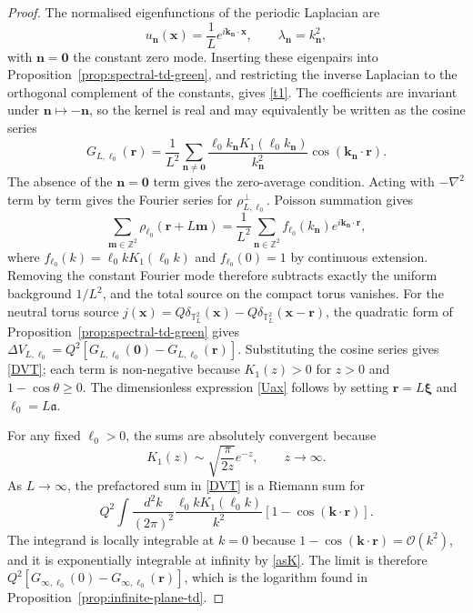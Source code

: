 \documentclass[openacc]{rsproca_new}%
\begin{document}
\begin{proof}
The normalised eigenfunctions of the periodic Laplacian are
\begin{equation}
  u_{\mathbf n}(\mathbf x)=\frac{1}{L}e^{i\mathbf k_{\mathbf n}\cdot\mathbf x},
  \qquad
  \lambda_{\mathbf n}=k_{\mathbf n}^2,
\end{equation}
with \(\mathbf n=\mathbf 0\) the constant zero mode. Inserting these eigenpairs into Proposition~\ref{prop:spectral-td-green}, and restricting the inverse Laplacian to the orthogonal complement of the constants, gives \eqref{t1}. The coefficients are invariant under \(\mathbf n\mapsto-\mathbf n\), so the kernel is real and may equivalently be written as the cosine series
\begin{equation}
  G_{L,\ell_0}(\mathbf r)=\frac{1}{L^2}\sum_{\mathbf n\neq\mathbf 0}
  \frac{\ell_0 k_{\mathbf n}K_1(\ell_0 k_{\mathbf n})}{k_{\mathbf n}^2}
  \cos(\mathbf k_{\mathbf n}\cdot\mathbf r).
\end{equation}
The absence of the \(\mathbf n=\mathbf 0\) term gives the zero-average condition. Acting with \(-\nabla^2\) term by term gives the Fourier series for \(\rho_{L,\ell_0}^{\perp}\). Poisson summation gives
\begin{equation}
  \sum_{\mathbf m\in\mathbb Z^2}\rho_{\ell_0}(\mathbf r+L\mathbf m)
  =\frac{1}{L^2}\sum_{\mathbf n\in\mathbb Z^2}f_{\ell_0}(k_{\mathbf n})e^{i\mathbf k_{\mathbf n}\cdot\mathbf r},
\end{equation}
where \(f_{\ell_0}(k)=\ell_0 kK_1(\ell_0 k)\) and \(f_{\ell_0}(0)=1\) by continuous extension. Removing the constant Fourier mode therefore subtracts exactly the uniform background \(1/L^2\), and the total source on the compact torus vanishes. For the neutral torus source \(j(\mathbf x)=Q\delta_{\mathbb T_L^2}(\mathbf x)-Q\delta_{\mathbb T_L^2}(\mathbf x-\mathbf r)\), the quadratic form of Proposition~\ref{prop:spectral-td-green} gives \(\Delta V_{L,\ell_0}=Q^2[G_{L,\ell_0}(\mathbf 0)-G_{L,\ell_0}(\mathbf r)]\). Substituting the cosine series gives \eqref{DVT}; each term is non-negative because \(K_1(z)>0\) for \(z>0\) and \(1-\cos\theta\geq0\). The dimensionless expression \eqref{Uax} follows by setting \(\mathbf r=L\boldsymbol{\xi}\) and \(\ell_0=L\mathfrak a\).

For any fixed \(\ell_0>0\), the sums are absolutely convergent because \cite{Abramowitz1972}
\begin{equation}\label{asK}
  K_1(z)\sim\sqrt{\frac{\pi}{2z}}e^{-z},\qquad z\to\infty .
\end{equation}
As \(L\to\infty\), the prefactored sum in \eqref{DVT} is a Riemann sum for
\begin{equation}
  Q^2\int\frac{d^2k}{(2\pi)^2}\frac{\ell_0 kK_1(\ell_0 k)}{k^2}
  \left[1-\cos(\mathbf k\cdot\mathbf r)\right].
\end{equation}
The integrand is locally integrable at \(k=0\) because \(1-\cos(\mathbf k\cdot\mathbf r)=\mathcal O(k^2)\), and it is exponentially integrable at infinity by \eqref{asK}. The limit is therefore \(Q^2[G_{\infty,\ell_0}(0)-G_{\infty,\ell_0}(\mathbf r)]\), which is the logarithm found in Proposition~\ref{prop:infinite-plane-td}.
\end{proof}
\end{document}
